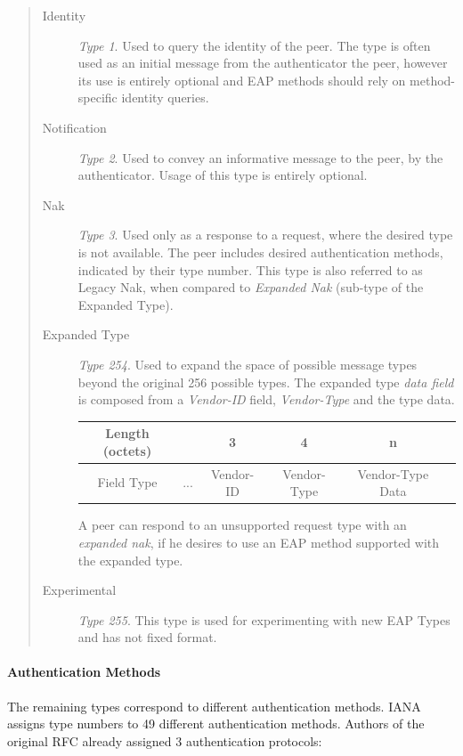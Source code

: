 \begin{quote}
\begin{description}
	\label{def:eap-identitiy}
	\item[Identity] \textit{Type 1}. Used to query the identity of the peer. The type is often used as an initial message from the authenticator the peer, however its use is entirely optional and EAP methods should rely on method-specific identity queries.
	
	\item[Notification]\textit{Type 2}. Used to convey an informative message to the peer, by the authenticator. Usage of this type is entirely optional.
	\item[Nak]\textit{Type 3}. Used only as a response to a request, where the desired type is not available.
	The peer includes desired authentication methods, indicated by their type number.
	This type is also referred to as Legacy Nak, when compared to \textit{Expanded Nak} (sub-type of the Expanded Type).
	\item[Expanded Type] \textit{Type 254}. 
	Used to expand the space of possible message types beyond the original 256 possible types.
	The expanded type \textit{data field} is composed from a \textit{Vendor-ID} field, \textit{Vendor-Type} and the type data.
	\bigskip
	\begin{center}
		\begin{tabular}{|c|c|c|c|c|c|}
		\cline{2-5}
		\hline
		Length (octets) & & 3 & 4 & n\\
		\hline
		Field Type & ... & Vendor-ID & Vendor-Type & Vendor-Type Data\\
		\hline
		\end{tabular}
	\end{center}
	\bigskip
	A peer can respond to an unsupported request type with an \textit{expanded nak}, if he desires to use an EAP method supported with the expanded type.
	\item[Experimental] \textit{Type 255}. This type is used for experimenting with new EAP Types and has not fixed format.
\end{description}
\end{quote}

\paragraph{Authentication Methods}
The remaining types correspond to different authentication methods.
IANA \cite{joseph2004eap} assigns type numbers to 49 different authentication methods.
Authors of the original RFC \cite{aboba2004extensible} already assigned 3 authentication protocols:

